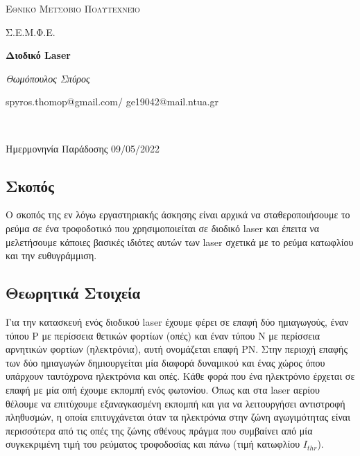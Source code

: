 \documentclass[a4paper]{article}
\begin{document}
\begin{titlepage}			%
	\centering
	{\scshape\LARGE Εθνικό Μετσόβιο Πολυτεχνείο\par}
	{\scshape \LARGE Σ.Ε.Μ.Φ.Ε.\par}
	\vspace{1cm}
	{\huge\bfseries Διοδικό Laser\par}
	\vspace{1cm}
	{\Large\itshape Θωμόπουλος Σπύρος\par}		%
	
	{\large spyros.thomop@gmail.com/ ge19042@mail.ntua.gr\par \hfill \\}%
	\vspace{1cm}
	{\large Ημερμονηνία Παράδοσης 09/05/2022\par}
\end{titlepage}

\subsection*{Σκοπός}

	Ο σκοπός της εν λόγω εργαστηριακής άσκησης είναι αρχικά να σταθεροποιήσουμε το ρεύμα σε ένα τροφοδοτικό που χρησιμοποιείται σε διοδικό laser και έπειτα να μελετήσουμε κάποιες βασικές ιδιότες αυτών των laser σχετικά με το ρεύμα κατωφλίου και την ευθυγράμμιση.

\subsection*{Θεωρητικά Στοιχεία}


	Για την κατασκευή ενός διοδικού laser έχουμε φέρει σε επαφή δύο ημιαγωγούς, έναν τύπου P με περίσσεια θετικών φορτίων (οπές) και έναν τύπου N με περίσσεια αρνητικών φορτίων (ηλεκτρόνια), αυτή ονομάζεται επαφή PN. Στην περιοχή επαφής των δύο ημιαγωγών δημιουργείται μία διαφορά δυναμικού και ένας χώρος όπου υπάρχουν ταυτόχρονα ηλεκτρόνια και οπές. Κάθε φορά που ένα ηλεκτρόνιο έρχεται σε επαφή με μία οπή έχουμε εκπομπή ενός φωτονίου. Όπως και στα laser αερίου θέλουμε να επιτύχουμε εξαναγκασμένη εκπομπή και για να λειτουργήσει αντιστροφή πληθυσμών, η οποία επιτυγχάνεται όταν τα ηλεκτρόνια στην ζώνη αγωγιμότητας είναι περισσότερα από τις οπές της ζώνης σθένους πράγμα που συμβαίνει από μία συγκεκριμένη τιμή του ρεύματος τροφοδοσίας και πάνω (τιμή κατωφλίου $I_{thr}$).
	
\end{document}
